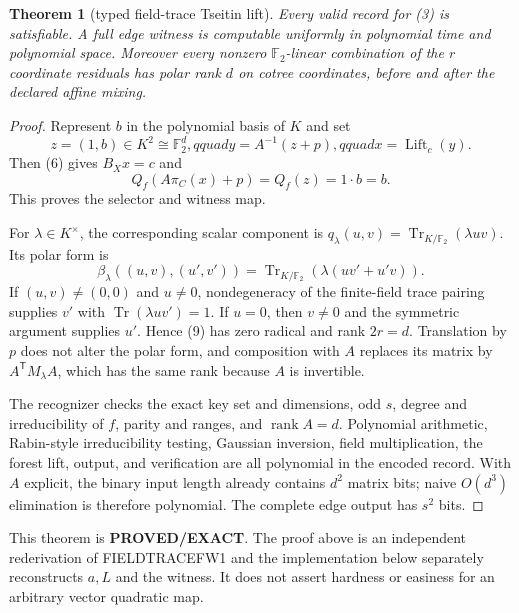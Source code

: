 \documentclass[11pt]{article}
\newtheorem{theorem}{Theorem}
\newcommand{\F}{\mathbb F_2}
\newcommand{\EXACT}{\textbf{PROVED/EXACT}}
\begin{document}
\begin{theorem}[typed field-trace Tseitin lift]
Every valid record for (3) is satisfiable.  A full edge witness is computable
uniformly in polynomial time and polynomial space.  Moreover every nonzero
$\F$-linear combination of the $r$ coordinate residuals has polar rank $d$
on cotree coordinates, before and after the declared affine mixing.
\end{theorem}
\begin{proof}
Represent $b$ in the polynomial basis of $K$ and set
\[
 z=(1,b)\in K^2\cong\F^d,qquad
 y=A^{-1}(z+p),qquad x=\operatorname{Lift}_c(y).         \tag{7}
\]
Then (6) gives $B_Xx=c$ and
\[
 Q_f(A\pi_C(x)+p)=Q_f(z)=1\cdot b=b.                    \tag{8}
\]
This proves the selector and witness map.

For $\lambda\in K^\times$, the corresponding scalar component is
$q_\lambda(u,v)=\operatorname{Tr}_{K/\F}(\lambda uv)$.  Its polar form is
\[
 \beta_\lambda((u,v),(u',v'))
 =\operatorname{Tr}_{K/\F}\!\left(\lambda(uv'+u'v)\right). \tag{9}
\]
If $(u,v)\ne(0,0)$ and $u\ne0$, nondegeneracy of the finite-field trace
pairing supplies $v'$ with $\operatorname{Tr}(\lambda uv')=1$.  If $u=0$,
then $v\ne0$ and the symmetric argument supplies $u'$.  Hence (9) has zero
radical and rank $2r=d$.  Translation by $p$ does not alter the polar form,
and composition with $A$ replaces its matrix by $A^{\mathsf T}M_\lambda A$,
which has the same rank because $A$ is invertible.

The recognizer checks the exact key set and dimensions, odd $s$, degree and
irreducibility of $f$, parity and ranges, and $\operatorname{rank}A=d$.
Polynomial arithmetic, Rabin-style irreducibility testing, Gaussian inversion,
field multiplication, the forest lift, output, and verification are all
polynomial in the encoded record.  With $A$ explicit, the binary input length
already contains $d^2$ matrix bits; naive $O(d^3)$ elimination is therefore
polynomial.  The complete edge output has $s^2$ bits.
\end{proof}

This theorem is \EXACT{}.  The proof above is an independent rederivation of
FIELDTRACEFW1 and the implementation below separately reconstructs $a,L$ and
the witness.  It does not assert hardness or easiness for an arbitrary vector
quadratic map.
\end{document}
